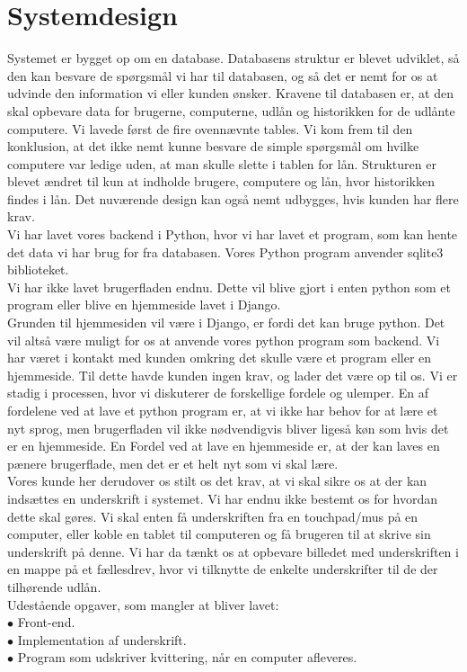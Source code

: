 \documentclass[a4paper]{article}
\begin{document}
\section{Systemdesign}
Systemet er bygget op om en database. Databasens struktur er blevet udviklet, så den kan besvare de spørgsmål vi har til databasen, og så det er nemt for os at udvinde den information vi eller kunden ønsker. Kravene til databasen er, at den skal opbevare data for brugerne, computerne, udlån og historikken for de udlånte computere. Vi lavede først de fire ovennævnte tables. Vi kom frem til den konklusion, at det ikke nemt kunne besvare de simple spørgsmål om hvilke computere var ledige uden, at man skulle slette i tablen for lån. Strukturen er blevet ændret til kun at indholde brugere, computere og lån, hvor historikken findes i lån. Det nuværende design kan også nemt udbygges, hvis kunden har flere krav. \\
Vi har lavet vores backend i Python, hvor vi har lavet et program, som kan hente det data vi har brug for fra databasen. Vores Python program anvender sqlite3 biblioteket. \\
Vi har ikke lavet brugerfladen endnu. Dette vil blive gjort i enten python som et program eller blive en hjemmeside lavet i Django.\\ Grunden til hjemmesiden vil være i Django, er fordi det kan bruge python. Det vil altså være muligt for os at anvende vores python program som backend. Vi har været i kontakt med kunden omkring det skulle være et program eller en hjemmeside. Til dette havde kunden ingen krav, og lader det være op til os. Vi er stadig i processen, hvor vi diskuterer de forskellige fordele og ulemper. En af fordelene ved at lave et python program er, at vi ikke har behov for at lære et nyt sprog, men brugerfladen vil ikke nødvendigvis bliver ligeså køn som hvis det er en hjemmeside. En Fordel ved at lave en hjemmeside er, at der kan laves en pænere brugerflade, men det er et helt nyt som vi skal lære. \\
Vores kunde her derudover os stilt os det krav, at vi skal sikre os at der kan indsættes en underskrift i systemet. Vi har endnu ikke bestemt os for hvordan dette skal gøres. Vi skal enten få underskriften fra en touchpad/mus på en computer, eller koble en tablet til computeren og få brugeren til at skrive sin underskrift på denne. Vi har da tænkt os at opbevare billedet med underskriften i en mappe på et fællesdrev, hvor vi tilknytte de enkelte underskrifter til de der tilhørende udlån. \\
Udestående opgaver, som mangler at bliver lavet: \\
$\bullet$ Front-end. \\
$\bullet$ Implementation af underskrift. \\
$\bullet$ Program som udskriver kvittering, når en computer afleveres.
\end{document}
